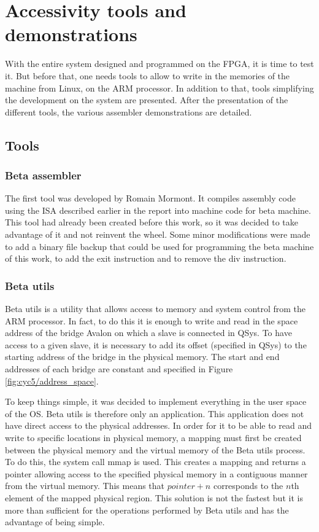 \chapter{Accessivity tools and demonstrations}

With the entire system designed and programmed on the FPGA, it is time to test it. But before that, 
one needs tools to allow to write in the memories of the machine from Linux, on the ARM processor. 
In addition to that, tools simplifying the development on the system are presented. After the 
presentation of the different tools, the various assembler demonstrations are detailed.

\section{Tools}

\subsection{Beta assembler}

The first tool was developed by Romain Mormont. It compiles
assembly code using the ISA described earlier in the report into machine code for beta machine. This tool 
had already been created before this work, so it was decided to take advantage of it and not 
reinvent the wheel. Some minor modifications were made to add a binary file backup that could be 
used for programming the beta machine of this work, to add the exit instruction and to remove the 
div instruction.

\subsection{Beta utils}

Beta utils is a utility that allows access to memory and system control from the ARM processor. In 
fact, to do this it is enough to write and read in the space address of the bridge Avalon on which
a slave is connected in QSys. To have access to a given slave, it is necessary to add its offset 
(specified in QSys) to the starting address of the bridge in the physical memory. The start and end 
addresses of each bridge are constant and specified in Figure \ref{fig:cyc5/address_space}. 

To keep things simple, it was decided to implement everything in the user space of the OS. Beta 
utils is therefore only an application. This application does not have direct access to the 
physical addresses. In order for it to be able to read and write to specific locations in physical 
memory, a mapping must first be created between the physical memory and the virtual memory of the 
Beta utils process. To do this, the system call mmap is used. This creates a mapping and returns a 
pointer allowing access to the specified physical memory in a contiguous manner from the virtual 
memory. This means that $pointer + n$ corresponds to the $n$th element of the mapped physical region. 
This solution is not the fastest but it is more than sufficient for the operations performed by Beta 
utils and has the advantage of being simple. 

